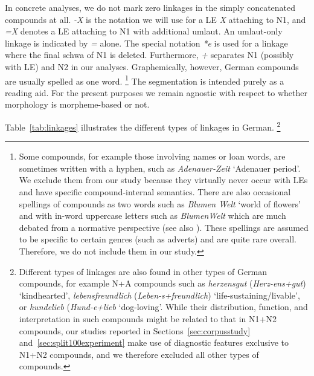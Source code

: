 In concrete analyses, we do not mark zero linkages in the simply concatenated compounds at all.
\textit{-X} is the notation we will use for a LE \textit{X} attaching to N1, and \textit{=X} denotes a LE attaching to N1 with additional umlaut.
An umlaut-only linkage is indicated by \textit{=} alone.
The special notation \textit{*e} is used for a linkage where the final schwa of N1 is deleted.
Furthermore, \textit{+} separates N1 (possibly with LE) and N2 in our analyses.
Graphemically, however, German compounds are usually spelled as one word.%
\footnote{Some compounds, for example those involving names or loan words, are sometimes written with a hyphen, such as \textit{Adenauer-Zeit} `Adenauer period'.
We exclude them from our study because they virtually never occur with LEs and have specific compound-internal semantics.
There are also occasional spellings of compounds as two words such as \textit{Blumen Welt} `world of flowers' and with in-word uppercase letters such as \textit{BlumenWelt} which are much debated from a normative perspective (see also \citealt{Scherer2012}).
These spellings are assumed to be specific to certain genres (such as adverts) and are quite rare overall.
Therefore, we do not include them in our study.}
The segmentation is intended purely as a reading aid.
For the present purposes we remain agnostic with respect to whether morphology is morpheme-based or not.

Table~\ref{tab:linkages} illustrates the different types of linkages in German.%
\footnote{Different types of linkages are also found in other types of German compounds, for example N+A compounds such as \textit{herzensgut} (\textit{Herz-ens+gut}) `kindhearted', \textit{lebensfreundlich} (\textit{Leben-s+freundlich}) `life-sustaining\slash livable', or \textit{hundelieb} (\textit{Hund-e+lieb} `dog-loving'.
While their distribution, function, and interpretation in such compounds might be related to that in N1+N2 compounds, our studies reported in Sections~\ref{sec:corpusstudy} and~\ref{sec:split100experiment} make use of diagnostic features exclusive to N1+N2 compounds, and we therefore excluded all other types of compounds.}

